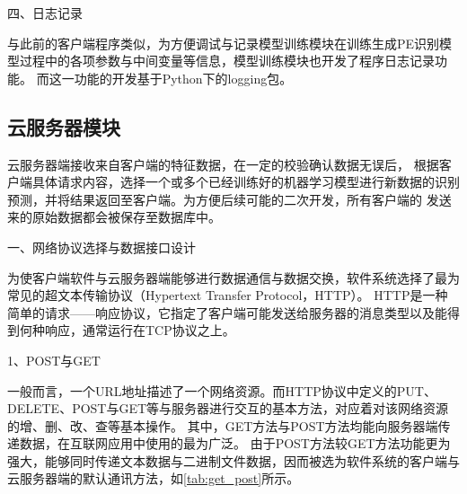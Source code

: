 四、日志记录

与此前的客户端程序类似，为方便调试与记录模型训练模块在训练生成PE识别模型过程中的各项参数与中间变量等信息，模型训练模块也开发了程序日志记录功能。
而这一功能的开发基于Python下的logging包。


\subsection{云服务器模块}
云服务器端接收来自客户端的特征数据，在一定的校验确认数据无误后，
根据客户端具体请求内容，选择一个或多个已经训练好的机器学习模型进行新数据的识别预测，并将结果返回至客户端。为方便后续可能的二次开发，所有客户端的
发送来的原始数据都会被保存至数据库中。


一、网络协议选择与数据接口设计

为使客户端软件与云服务器端能够进行数据通信与数据交换，软件系统选择了最为常见的超文本传输协议（Hypertext Transfer Protocol，HTTP）。
HTTP是一种简单的请求——响应协议，它指定了客户端可能发送给服务器的消息类型以及能得到何种响应，通常运行在TCP协议之上。

1、POST与GET

一般而言，一个URL地址描述了一个网络资源。而HTTP协议中定义的PUT、DELETE、POST与GET等与服务器进行交互的基本方法，对应着对该网络资源的增、删、改、查等基本操作。
其中，GET方法与POST方法均能向服务器端传递数据，在互联网应用中使用的最为广泛。
由于POST方法较GET方法功能更为强大，能够同时传递文本数据与二进制文件数据，因而被选为软件系统的客户端与云服务器端的默认通讯方法，如\autoref{tab:get_post}所示。


